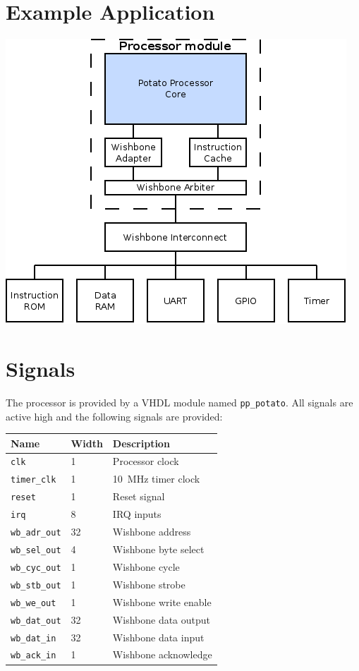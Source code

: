 \documentclass[10pt,a4paper]{article}
\begin{document}
\begin{minipage}[t]{0.48\textwidth}

\section{Example Application}
\includegraphics[width=\textwidth]{example.png}

\section{Signals}

The processor is provided by a VHDL module named \texttt{pp\_potato}. All signals
are active high and the following signals are provided:\\

\begin{tabularx}{\textwidth}{|l|l|X|}
\hline
\textbf{Name} & \textbf{Width} & \textbf{Description} \\
\hline
\texttt{clk} & 1 & Processor clock \\
\texttt{timer\_clk} & 1 & 10~MHz timer clock \\
\texttt{reset} & 1 & Reset signal \\
\hline
\texttt{irq} & 8 & IRQ inputs \\
\hline
\texttt{wb\_adr\_out} & 32 & Wishbone address \\
\texttt{wb\_sel\_out} & 4 & Wishbone byte select \\
\texttt{wb\_cyc\_out} & 1 & Wishbone cycle \\
\texttt{wb\_stb\_out} & 1 & Wishbone strobe \\
\texttt{wb\_we\_out} & 1 & Wishbone write enable \\
\texttt{wb\_dat\_out} & 32 & Wishbone data output \\
\texttt{wb\_dat\_in} & 32 & Wishbone data input \\
\texttt{wb\_ack\_in} & 1 & Wishbone acknowledge \\
\hline
\end{tabularx}\\


\end{minipage}
\end{document}
